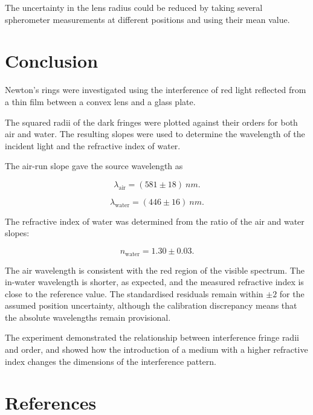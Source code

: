 \documentclass[12pt,a4paper]{article}
\begin{document}
The uncertainty in the lens radius
could be reduced by taking several
spherometer measurements at
different positions and using
their mean value.

\newpage

\section{Conclusion}

Newton's rings were investigated
using the interference of red
light reflected from a thin film
between a convex lens and a
glass plate.

The squared radii of the
dark fringes were plotted against
their orders for both air and
water. The resulting slopes were
used to determine the wavelength
of the incident light and the
refractive index of water.

The air-run slope gave the source
wavelength as

\[
\boxed{
\lambda_{\mathrm{air}}=(581\pm18)\ \si{nm}
}.
\]

\[
\boxed{
\lambda_{\mathrm{water}}=(446\pm16)\ \si{nm}
}.
\]

The refractive index of water
was determined from the ratio
of the air and water slopes:

\[
\boxed{
n_{\mathrm{water}}=1.30\pm0.03
}.
\]

The air wavelength is consistent
with the red region of the visible
spectrum. The in-water wavelength
is shorter, as expected, and the
measured refractive index is close
to the reference value. The
standardised residuals remain
within $\pm2$ for the assumed
position uncertainty, although
the calibration discrepancy means
that the absolute wavelengths
remain provisional.

The experiment demonstrated
the relationship between
interference fringe radii
and order, and showed how
the introduction of a medium
with a higher refractive index
changes the dimensions of
the interference pattern.

\section{References}

\printbibliography[heading=none]

\newpage
\end{document}
